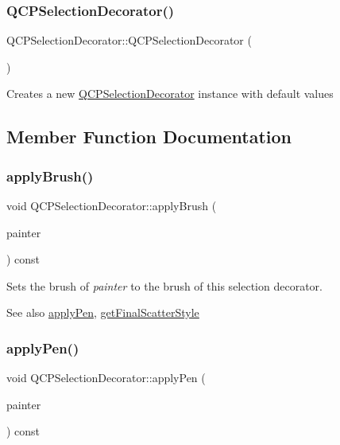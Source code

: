\subsubsection{\texorpdfstring{Q\+C\+P\+Selection\+Decorator()}{QCPSelectionDecorator()}}
{\footnotesize\ttfamily Q\+C\+P\+Selection\+Decorator\+::\+Q\+C\+P\+Selection\+Decorator (\begin{DoxyParamCaption}{ }\end{DoxyParamCaption})}

Creates a new \hyperlink{classQCPSelectionDecorator}{Q\+C\+P\+Selection\+Decorator} instance with default values 

\subsection{Member Function Documentation}
\mbox{\label{classQCPSelectionDecorator_a225544527d51b49546b70d0e6d655a34}} 
\subsubsection{\texorpdfstring{apply\+Brush()}{applyBrush()}}
{\footnotesize\ttfamily void Q\+C\+P\+Selection\+Decorator\+::apply\+Brush (\begin{DoxyParamCaption}\item[{\hyperlink{classQCPPainter}{Q\+C\+P\+Painter} $\ast$}]{painter }\end{DoxyParamCaption}) const}

Sets the brush of {\itshape painter} to the brush of this selection decorator.

\begin{DoxySeeAlso}{See also}
\hyperlink{classQCPSelectionDecorator_a75098893f7d08660ea449206810679d7}{apply\+Pen}, \hyperlink{classQCPSelectionDecorator_a1277b373248896bc70e8cc1de96da9fa}{get\+Final\+Scatter\+Style} 
\end{DoxySeeAlso}
\mbox{\label{classQCPSelectionDecorator_a75098893f7d08660ea449206810679d7}} 
\subsubsection{\texorpdfstring{apply\+Pen()}{applyPen()}}
{\footnotesize\ttfamily void Q\+C\+P\+Selection\+Decorator\+::apply\+Pen (\begin{DoxyParamCaption}\item[{\hyperlink{classQCPPainter}{Q\+C\+P\+Painter} $\ast$}]{painter }\end{DoxyParamCaption}) const}

